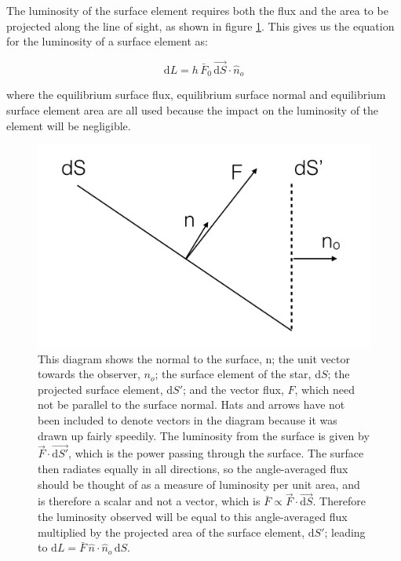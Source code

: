 \documentclass[11pt]{amsart}
\begin{document}
The luminosity of the surface element requires both the flux and the area to be projected along the line of sight, as shown in figure \ref{fig:flux_diagram}.  This gives us the equation for the luminosity of a surface element as:

\begin{equation}
\text{d}L = h \, \bar{F}_{0} \, \vec{\text{d}S} \! \cdot \! \hat{n}_{o}
\end{equation}

where the equilibrium surface flux, equilibrium surface normal and equilibrium surface element area are all used because the impact on the luminosity of the element will be negligible.

\begin{figure}
\begin{center}
\includegraphics[width = 0.75 \textwidth]{flux_diagram.png}
\caption{This diagram shows the normal to the surface, n; the unit vector towards the observer, $n_{o}$; the surface element of the star, d$S$; the projected surface element, d$S'$; and the vector flux, $F$, which need not be parallel to the surface normal.  Hats and arrows have not been included to denote vectors in the diagram because it was drawn up fairly speedily.  The luminosity from the surface is given by $\vec{F} \! \cdot \! \vec{\text{d}S'}$, which is the power passing through the surface.  The surface then radiates equally in all directions, so the angle-averaged flux should be thought of as a measure of luminosity per unit area, and is therefore a scalar and not a vector, which is $\bar{F} \propto \vec{F} \! \cdot \! \vec{\text{d}S}$.  Therefore the luminosity observed will be equal to this angle-averaged flux multiplied by the projected area of the surface element, $\text{d}S'$; leading to $\text{d}L = \bar{F} \, \hat{n} \! \cdot \! \hat{n}_{o} \, \text{d}S$.}
\label{fig:flux_diagram}
\end{center}
\end{figure}
\end{document}
